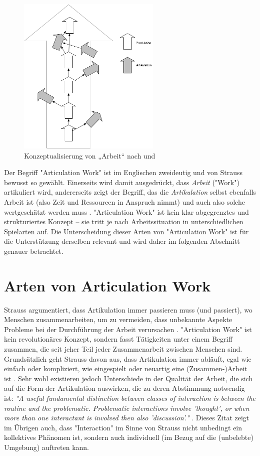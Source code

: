 \begin{figure}[htbp]
	\centering
		\includegraphics[height=3in]{img/ArticulationWork/ArtikulationProduktion.png}
	\caption{Konzeptualisierung von „Arbeit“ nach \citep{Strauss85} und \citep{Fujimura87}}
	\label{fig:img_ArticulationWork_ArtikulationProduktion}
\end{figure}

Der Begriff "Articulation Work" ist im Englischen zweideutig und von Strauss bewusst so gewählt. Einerseits wird damit ausgedrückt, dass \emph{Arbeit} ("Work") artikuliert wird, andererseits zeigt der Begriff, das die \emph{Artikulation} selbst ebenfalls Arbeit ist (also Zeit und Ressourcen in Anspruch nimmt) und auch also solche wertgeschätzt werden muss \citep{Fujimura87}. "Articulation Work" ist kein klar abgegrenztes und strukturiertes Konzept – sie tritt je nach Arbeitssituation in unterschiedlichen Spielarten auf. Die Unterscheidung dieser Arten von "Articulation Work" ist für die Unterstützung derselben relevant und wird daher im folgenden Abschnitt genauer betrachtet.

\section{Arten von Articulation Work} %
\label{sec:arten_von_articulation_work}

Strauss argumentiert, dass Artikulation immer passieren muss (und passiert), wo Menschen zusammenarbeiten, um zu vermeiden, dass unbekannte Aspekte Probleme bei der Durchführung der Arbeit verursachen \citep{Strauss88}. "Articulation Work" ist kein revolutionäres Konzept, sondern fasst Tätigkeiten unter einem Begriff zusammen, die seit jeher Teil jeder Zusammenarbeit zwischen Menschen sind. Grundsätzlich geht Strauss davon aus, dass Artikulation immer abläuft, egal wie einfach oder kompliziert, wie eingespielt oder neuartig eine (Zusammen-)Arbeit ist \citep{Strauss88}. Sehr wohl existieren jedoch Unterschiede in der Qualität der Arbeit, die sich auf die Form der Artikulation auswirken, die zu deren Abstimmung notwendig ist: \emph{"A useful fundamental distinction between classes of interaction is between the routine and the problematic. Problematic interactions involve 'thought', or when more than one interactant is involved then also 'discussion'."} \citep{Strauss93}. Dieses Zitat zeigt im Übrigen auch, dass "Interaction" im Sinne von Strauss nicht unbedingt ein kollektives Phänomen ist, sondern auch individuell (im Bezug auf die (unbelebte) Umgebung) auftreten kann.

